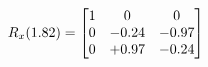 \documentclass[preview]{standalone}
\begin{document}
\begin{align*}
\special{dvisvgm:raw <g id='unique000'>}R_{x}(1.82) = \begin{bmatrix}1 & 0 & 0 \\0 & -0.24 & -0.97 \\0 & +0.97 & -0.24\end{bmatrix}\special{dvisvgm:raw </g>}
\end{align*}
\end{document}
